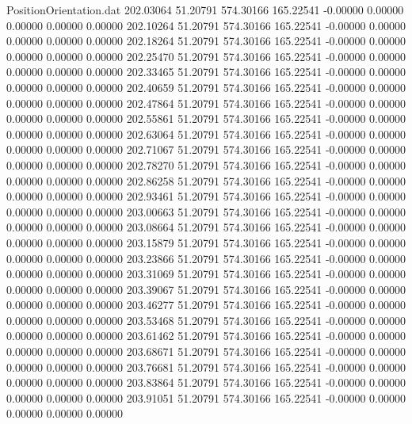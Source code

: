 \begin{filecontents}{PositionOrientation.dat}
 202.03064   51.20791  574.30166   165.22541   -0.00000    0.00000    0.00000    0.00000    0.00000
 202.10264   51.20791  574.30166   165.22541   -0.00000    0.00000    0.00000    0.00000    0.00000
 202.18264   51.20791  574.30166   165.22541   -0.00000    0.00000    0.00000    0.00000    0.00000
 202.25470   51.20791  574.30166   165.22541   -0.00000    0.00000    0.00000    0.00000    0.00000
 202.33465   51.20791  574.30166   165.22541   -0.00000    0.00000    0.00000    0.00000    0.00000
 202.40659   51.20791  574.30166   165.22541   -0.00000    0.00000    0.00000    0.00000    0.00000
 202.47864   51.20791  574.30166   165.22541   -0.00000    0.00000    0.00000    0.00000    0.00000
 202.55861   51.20791  574.30166   165.22541   -0.00000    0.00000    0.00000    0.00000    0.00000
 202.63064   51.20791  574.30166   165.22541   -0.00000    0.00000    0.00000    0.00000    0.00000
 202.71067   51.20791  574.30166   165.22541   -0.00000    0.00000    0.00000    0.00000    0.00000
 202.78270   51.20791  574.30166   165.22541   -0.00000    0.00000    0.00000    0.00000    0.00000
 202.86258   51.20791  574.30166   165.22541   -0.00000    0.00000    0.00000    0.00000    0.00000
 202.93461   51.20791  574.30166   165.22541   -0.00000    0.00000    0.00000    0.00000    0.00000
 203.00663   51.20791  574.30166   165.22541   -0.00000    0.00000    0.00000    0.00000    0.00000
 203.08664   51.20791  574.30166   165.22541   -0.00000    0.00000    0.00000    0.00000    0.00000
 203.15879   51.20791  574.30166   165.22541   -0.00000    0.00000    0.00000    0.00000    0.00000
 203.23866   51.20791  574.30166   165.22541   -0.00000    0.00000    0.00000    0.00000    0.00000
 203.31069   51.20791  574.30166   165.22541   -0.00000    0.00000    0.00000    0.00000    0.00000
 203.39067   51.20791  574.30166   165.22541   -0.00000    0.00000    0.00000    0.00000    0.00000
 203.46277   51.20791  574.30166   165.22541   -0.00000    0.00000    0.00000    0.00000    0.00000
 203.53468   51.20791  574.30166   165.22541   -0.00000    0.00000    0.00000    0.00000    0.00000
 203.61462   51.20791  574.30166   165.22541   -0.00000    0.00000    0.00000    0.00000    0.00000
 203.68671   51.20791  574.30166   165.22541   -0.00000    0.00000    0.00000    0.00000    0.00000
 203.76681   51.20791  574.30166   165.22541   -0.00000    0.00000    0.00000    0.00000    0.00000
 203.83864   51.20791  574.30166   165.22541   -0.00000    0.00000    0.00000    0.00000    0.00000
 203.91051   51.20791  574.30166   165.22541   -0.00000    0.00000    0.00000    0.00000    0.00000

\end{filecontents}
